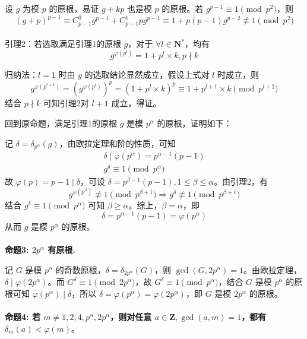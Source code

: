 \documentclass[12pt,a4paper]{article}
\begin{document}
设 $g$ 为模 $p$ 的原根，易证 $g+kp$ 也是模 $p$ 的原根。若 $g^{p-1}\equiv1\pmod{p^2}$，则 
\begin{equation*}
	(g+p)^{p-1}\equiv C^0_{p-1}g^{p-1}+C^1_{p-1}pg^{p-1}\equiv1+p(p-1)g^{p-2}\not\equiv1\pmod{p^2}
\end{equation*}
\\引理2：若选取满足引理1的原根 $g$，对于 $\forall l\in\mathbf{N^*}$，均有 
\begin{equation*}
	g^{\varphi(p^l)}=1+p^l\times k,p\nmid k
\end{equation*}

归纳法：$l=1$ 时由 $g$ 的选取结论显然成立，假设上式对 $l$ 时成立，则 
\begin{equation*}
	g^{\varphi(p^{l+1})}=(g^{\varphi(p^l)})^p=(1+p^l\times k)^p\equiv1+p^{l+1}\times k\pmod{p^{l+2}}
\end{equation*}
结合 $p\nmid k$ 可知引理2对 $l+1$ 成立，得证。

回到原命题，满足引理1的原根 $g$ 是模 $p^\alpha$ 的原根，证明如下：

记 $\delta=\delta_{p^\alpha}(g)$，由欧拉定理和阶的性质，可知 
\begin{align*}
	\delta\mid\varphi(p^\alpha)=p^{\alpha-1}(p-1)\\ g^\delta\equiv1\pmod{p^\alpha}
\end{align*}
故 $\varphi(p)=p-1\mid \delta$，可设 $\delta=p^{\beta-1}(p-1),1\le\beta\le \alpha$。由引理2，有 \begin{equation*}
	g^{\varphi(p^{\beta})}\not\equiv 1\pmod {p^{\beta+1}}\Rightarrow g^{\delta}\not\equiv 1\pmod {p^{\beta+1}}
\end{equation*}结合 $g^\delta\equiv1\pmod{p^\alpha}$ 可知 $\beta\ge \alpha$。综上，$\beta=\alpha$，即 
\begin{equation*}
	\delta=p^{\alpha-1}(p-1)=\varphi(p^\alpha)
\end{equation*}从而 $g$ 是模 $p^\alpha$ 的原根。
\\
\\\textbf{命题3: $2p^\alpha$ 有原根.}

记 $G$ 是模 $p^\alpha$ 的奇数原根，$\delta=\delta_{2p^\alpha}(G)$，则 $\gcd(G, 2p^\alpha)=1$。由欧拉定理，$\delta\mid \varphi(2p^\alpha)$。而 $G^\delta\equiv1\pmod{2p^\alpha}$，故 $G^\delta\equiv1\pmod{p^\alpha}$，结合 $G$ 是模 $p^\alpha$ 的原根可知 $\varphi(p^\alpha)\mid \delta$，所以 $\delta=\varphi(p^\alpha)=\varphi(2p^\alpha)$，即 $G$ 是模 $2p^\alpha$ 的原根。
\\
\\\textbf{命题4: 若 $m\neq 1,2,4,p^\alpha,2p^\alpha$，则对任意 $a\in\mathbf{Z},\gcd(a,m)=1$，都有 $\delta_m(a)<\varphi(m)$}。
\end{document}
